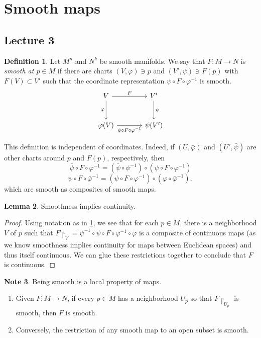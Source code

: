 \documentclass[10pt,letterpaper,cm]{nupset}
\theoremstyle{definition}
\newtheorem{definition}{Definition}[subsection]
\newtheorem{note}[definition]{Note}
\theoremstyle{theorem}
\newtheorem{lemma}[definition]{Lemma}
\theoremstyle{remark}
\newcommand{\1}{\mathbf{1}}
\newcommand{\0}{\vec 0}
\begin{document}
\section{Smooth maps}

\subsection{Lecture 3}

\begin{definition}\label{smap}
Let $M^n$ and $N^k$ be smooth manifolds. We say that $F: M \to N$ is \textit{smooth at $p \in M$} if there are charts $(V, \varphi) \ni p$ and $(V', \psi) \ni F(p)$ with $F(V) \subset V'$ such that the coordinate representation $\psi \circ F \circ \varphi^{-1}$ is smooth.
\[
\begin{tikzcd}[row sep=large, column sep = large]
V \arrow[r, "F"] \arrow[d, "\varphi", swap]
& V' \arrow[d, "\psi"] \\
\varphi(V) \arrow[r, "\psi \circ F \circ \varphi^{-1}"']
& \psi(V')
\end{tikzcd}
\]
\end{definition}

This definition is independent of coordinates. Indeed, if $(U, \bar{\varphi})$ and $(U', \bar{\psi})$ are other charts around $p$ and $F(p)$, respectively, then $$\bar{\psi} \circ F \circ \varphi^{-1} = (\bar{\psi} \circ \psi^{-1}) \circ (\psi \circ F \circ \varphi^{-1})$$ $$\psi \circ F\circ \bar{\varphi}^{-1} = (\psi \circ F \circ \varphi^{-1}) \circ (\varphi \circ \bar{\varphi}^{-1}),$$ which are smooth as composites of smooth maps.

\begin{lemma}\label{sco}
Smoothness implies continuity.
\end{lemma}
\begin{proof}
Using notation as in \cref{smap}, we see that for each $p\in M$, there is a neighborhood $V$ of $p$ such that $F\restriction_V =  \psi^{-1} \circ \psi \circ F \circ \varphi^{-1} \circ \varphi$ is a composite of continuous maps (as we know smoothness implies continuity for maps between Euclidean spaces) and thus itself continuous. We can glue these restrictions together to conclude that $F$ is continuous. 
\end{proof}


\begin{note} Being smooth is a local property of maps.
\begin{enumerate}
\item Given $F:M\to N$, if every $p\in M$ has a neighborhood $U_p$ so that $F\restriction_{U_p}$ is smooth, then $F$ is smooth.
\item Conversely, the restriction of any smooth map to an open subset is smooth. 
\end{enumerate}
\end{note}
\end{document}

